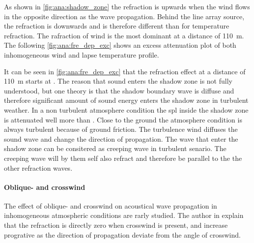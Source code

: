 
As shown in \autoref{fig:ana:shadow_zone} the refraction is upwards when the wind flows in the opposite direction as the wave propagation. Behind the line array source, the refraction is downwards and is therefore different than for temperature refraction. The rafraction of wind is the most dominant at a distance of \SI{110}{\meter}. The following \autoref{fig:ana:fre_dep_exc} shows an excess attenuation plot of both inhomogeneous wind and lapse temperature profile. 


It can be seen in \autoref{fig:ana:fre_dep_exc} that the refraction effect at a distance of \SI{110}{\meter} starts at . The reason that sound enters the shadow zone is not fully understood, but one theory is that the shadow boundary wave is diffuse and therefore significant amount of sound energy enters the shadow zone in turbulent weather. In a non turbulent atmosphere condition the \gls{spl} inside the shadow zone is attenuated well more than . Close to the ground the atmosphere condition is always turbulent because of ground friction. The turbulence wind diffuses the sound wave and change the direction of propagation. The wave that enter the shadow zone can be consitered as creeping wave in turbulent senario. The creeping wave will by them self also refract and therefore be parallel to the the other refraction waves. \citep{tur_on_sound}




\paragraph{Oblique- and crosswind} The effect of oblique- and crosswind on acoustical wave propagation in inhomogeneous atmospheric conditions are rarly studied. The author in \citep{review_of_sound} explain that the refraction is directly zero when crosswind is present, and increase progrative as the direction of propagation deviate from the angle of crosswind. 

